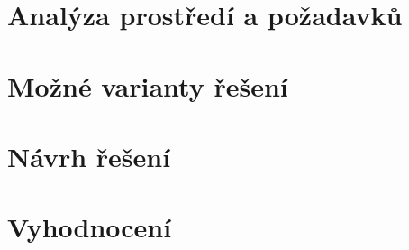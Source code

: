 \documentclass[thesis=M,czech]{FITthesis}[2012/06/26]
\begin{document}
\chapter{Analýza prostředí a požadavků}\label{k2}
 
 
\chapter{Možné varianty řešení}\label{k3}
  
 

\chapter{Návrh řešení}\label{k4}
  

\chapter{Vyhodnocení}\label{k5}
   

\begin{conclusion}\label{k6}
	
\end{conclusion}





\appendix

\end{document}
